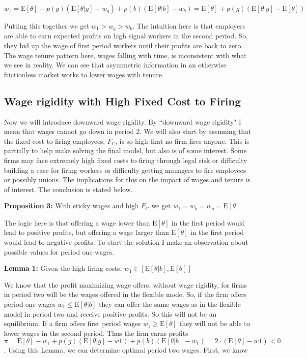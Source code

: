 \documentclass[11pt]{article}
\newcommand{\E}{\mathrm{E}}
\begin{document}
	
$$w_1 = \E[\theta] + p(g)(\E[\theta|g] - w_g) + p(b)(\E[\theta | b] - w_b) 
 = \E[\theta] + p(g)(\E[\theta | g] - \E[\theta]) $$
 
 Putting this together we get $w_1 > w_g > w_b$. The intuition here is that employers are able to earn expected profits on high signal workers in the second period. So, they bid up the wage of first period workers until their profits are back to zero. The wage tenure pattern here, wages falling with time, is inconsistent with what we see in reality. We can see that asymmetric information in an otherwise frictionless market works to lower wages with tenure.
 
 \subsection{Wage rigidity with High Fixed Cost to Firing }
 
 Now we will introduce downward wage rigidity. By ``downward wage rigidity" I mean that wages cannot go down in period 2. We will also start by assuming that the fixed cost to firing employees, $F_C$, is so high that no firm fires anyone. This is partially to help make solving the final model, but also is of some interest. Some firms may face extremely high fixed costs to firing through legal risk or difficulty building a case for firing workers or difficulty getting managers to fire employees or possibly unions. The implications for this on the impact of wages and tenure is of interest. The conclusion is stated below. 
 
 \textbf{Proposition 3:} With sticky wages and high $F_C$ we get  $w_1 = w_b = w_g =\E[\theta]$
 
 The logic here is that offering a wage lower than $\E[\theta]$ in the first period would lead to positive profits, but offering a wage larger than $\E[\theta]$ in the first period would lead to negative profits. To start the solution I make an observation about possible values for period one wages. 
 
 \textbf{Lemma 1:} Given the high firing costs, $w_1 \in \left[\E[\theta|b], \E[\theta] \right]$ 
 
 We know that the profit maximizing wage offers, without wage rigidity, for firms in period 
two will be the wages offered in the flexible mode. So, if the firm offers period one wages 
$w_1 \leq \E[\theta | b]$ they can offer the same wages as in the flexible model in period two 
and receive positive profits. So this will not be an equilibrium. If a firm offers first 
period wages $w_1 \geq \E[\theta]$ they will not be able to lower wages in the second period. Thus the firm earns profits $\pi = \E[\theta] - w_1 + p(g)(\E[\theta|g] - w1) + p(b)(\E[\theta|b] - w_1) = 2\cdot(\E[\theta] - w1) < 0 $. Using this Lemma, we can determine optimal period two wages. First, we know 
\end{document}
